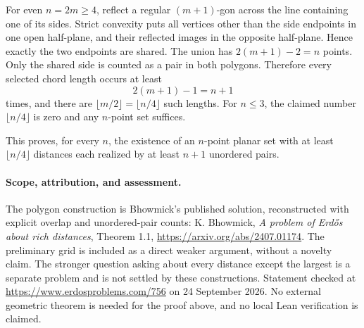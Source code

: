 For even \(n=2m\geq4\), reflect a regular \((m+1)\)-gon across the line containing one of its sides. Strict convexity puts all vertices other than the side endpoints in one open half-plane, and their reflected images in the opposite half-plane. Hence exactly the two endpoints are shared. The union has \(2(m+1)-2=n\) points. Only the shared side is counted as a pair in both polygons. Therefore every selected chord length occurs at least
\[
 2(m+1)-1=n+1
\]
times, and there are \(\lfloor m/2\rfloor=\lfloor n/4\rfloor\) such lengths. For \(n\leq3\), the claimed number \(\lfloor n/4\rfloor\) is zero and any \(n\)-point set suffices.

This proves, for every \(n\), the existence of an \(n\)-point planar set with at least \(\lfloor n/4\rfloor\) distances each realized by at least \(n+1\) unordered pairs.

\paragraph{Scope, attribution, and assessment.}
The polygon construction is Bhowmick's published solution, reconstructed with explicit overlap and unordered-pair counts: K. Bhowmick, \emph{A problem of Erd\H{o}s about rich distances}, Theorem 1.1, \url{https://arxiv.org/abs/2407.01174}. The preliminary grid is included as a direct weaker argument, without a novelty claim. The stronger question asking about every distance except the largest is a separate problem and is not settled by these constructions. Statement checked at \url{https://www.erdosproblems.com/756} on 24 September 2026. No external geometric theorem is needed for the proof above, and no local Lean verification is claimed.
